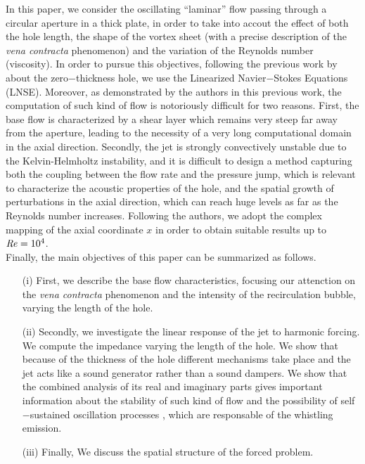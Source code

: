 \documentclass{jfm}
\begin{document}
In this paper, we consider the oscillating ``laminar'' flow passing through a circular aperture in a thick plate, in order to take into accout the effect of both the hole length, the shape of the vortex sheet (with a precise description of the {\em vena contracta} phenomenon) and the variation of the Reynolds number (viscosity). In order to pursue this objectives, following the previous work by \citet{fabre2018} about the zero$-$thickness hole, we use the Linearized Navier$-$Stokes Equations (LNSE). Moreover, as demonstrated by the authors in this previous work, the computation of such kind of flow is notoriously difficult for two reasons. First, the base flow is characterized by a shear layer which remains very steep far away from the aperture, leading to the necessity of a very long computational domain in the axial direction. Secondly, the jet is strongly convectively unstable due to the Kelvin-Helmholtz instability, and it is difficult to design a method capturing both the coupling between the flow rate and the pressure jump, which is relevant to characterize the acoustic properties of the hole, and the spatial growth of perturbations in the axial direction, which can reach huge levels as far as the Reynolds number increases. Following the authors, we adopt the complex mapping of the axial coordinate $x$ in order to obtain suitable results up to $\mbox{\textit{Re}} = 10^4$.\\

Finally, the main objectives of this paper can be summarized as follows.

\begin{itemize}
\item[(i)] First, we describe the base flow characteristics, focusing our attenction on the {\em vena contracta} phenomenon and the intensity of the recirculation bubble, varying the length of the hole.
 
 \item[(ii)]  Secondly, we investigate the linear response of the jet to harmonic forcing. We compute the impedance varying the length of the hole. We show that because of the thickness of the hole different mechanisms take place and the jet acts like a sound generator rather than a sound dampers. We show that the combined analysis of its real and imaginary parts gives important information about the stability of such kind of flow and the possibility of self$-$sustained oscillation processes \citep{howe1997influence}, which are responsable of the whistling emission. 

\item [(iii)] Finally, We discuss the spatial structure of the forced problem.
\end{itemize}
\end{document}
